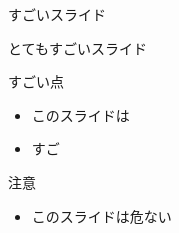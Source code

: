 \documentclass[uplatex,dvipdfmx,ja=standard]{beamer}
\begin{document}
%
%

\begin{frame}{すごいスライド}

\end{frame}

\begin{frame}{とてもすごいスライド}
  \begin{block}{すごい点}
    \begin{itemize}
      \item このスライドは
      \item すご
    \end{itemize}
  \end{block}
  \begin{alertblock}{注意}
    \begin{itemize}
      \item このスライドは\alert{危ない}
    \end{itemize}
  \end{alertblock}
\end{frame}


%
%
\end{document}
